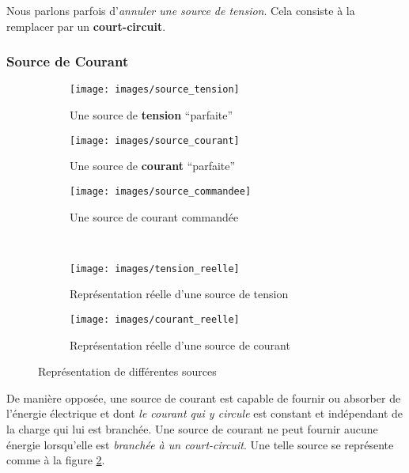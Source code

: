\documentclass[12pt,a4paper]{article}
\begin{document}
 Nous parlons parfois d'\textit{annuler une source de tension}. Cela consiste à la remplacer par un \textbf{court-circuit}.
\subsubsection{Source de Courant}
\label{subsubsection: def source courant}
\begin{figure}
	\centering
	\captionsetup{justification=centering}		
	\begin{subfigure}[b]{0.27\textwidth}
		\captionsetup{justification=centering}	
		\centering
		\texttt{[image: images/source\_tension]}
		\caption{Une source de \textbf{tension} ``parfaite''}
		\label{subfig: source de tension}
	\end{subfigure}
	\begin{subfigure}[b]{0.27\textwidth}
		\captionsetup{justification=centering}	
		\centering
		\texttt{[image: images/source\_courant]}
		\caption{Une source de \textbf{courant} ``parfaite''}
		\label{subfig: source de courant}
	\end{subfigure}
	\begin{subfigure}[b]{0.27\textwidth}
		\captionsetup{justification=centering}	
		\centering
		\texttt{[image: images/source\_commandee]}
		\caption{Une source de courant commandée}
		\label{subfig: source de courant commandee}
	\end{subfigure}\\
	\begin{subfigure}[b]{0.45\textwidth}
		\centering
		\texttt{[image: images/tension\_reelle]}
		\caption{Représentation réelle d'une source de tension}
		\label{subfig: source tension reelle}
	\end{subfigure}
	\begin{subfigure}[b]{0.45\textwidth}
		\centering
		\texttt{[image: images/courant\_reelle]}
		\caption{Représentation réelle d'une source de courant}
		\label{subfig: source courant reelle}
	\end{subfigure}	
	\caption{Représentation de différentes sources}
\end{figure}
De manière opposée, une source de courant est capable de fournir ou absorber de l'énergie électrique et dont \textit{le courant qui y circule} est constant et indépendant de la charge qui lui est branchée. Une source de courant ne peut fournir aucune énergie lorsqu'elle est \textit{branchée à un court-circuit}. Une telle source se représente comme à la figure  \ref{subfig: source de courant}.
\end{document}
